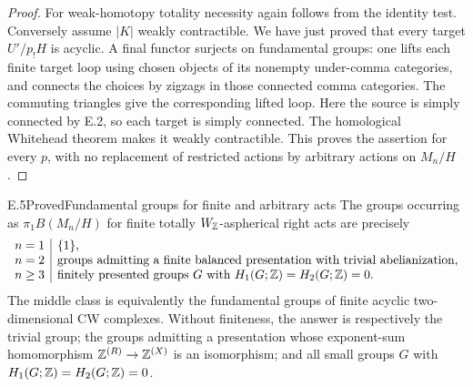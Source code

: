 \begin{proof}
For weak-homotopy totality necessity again follows from the identity
test. Conversely assume $|K|$ weakly contractible. We have just
proved that every target $U'/p_!H$ is acyclic. A final functor
surjects on fundamental groups: one lifts each finite target loop
using chosen objects of its nonempty under-comma categories, and
connects the choices by zigzags in those connected comma categories.
The commuting triangles give the corresponding lifted loop.
Here the source is simply connected by E.2, so each target is
simply connected. The homological Whitehead theorem makes it weakly
contractible. This proves the assertion for every $p$, with no
replacement of restricted actions by arbitrary actions on $M_n/H$.
\end{proof}

\begin{claim}{E.5}{Proved}{Fundamental groups for finite and arbitrary acts}
\label{E:groups}
The groups occurring as $\pi_1B(M_n/H)$ for finite totally
$W_{\mathbb Z}$-aspherical right acts are precisely
\[
\begin{array}{c|l}
n=1&\{1\},\\
n=2&\text{groups admitting a finite balanced presentation with trivial abelianization},\\
n\geq3&\text{finitely presented groups }G\text{ with }H_1(G;\mathbb Z)=H_2(G;\mathbb Z)=0.
\end{array}
\]
The middle class is equivalently the fundamental groups of finite
acyclic two-dimensional CW complexes. Without finiteness, the
answer is respectively the trivial group; the groups admitting a
presentation whose exponent-sum homomorphism
$\mathbb Z^{(R)}\to\mathbb Z^{(X)}$ is an isomorphism; and all small groups
$G$ with $H_1(G;\mathbb Z)=H_2(G;\mathbb Z)=0$.
\end{claim}
